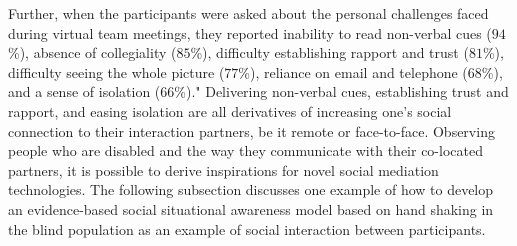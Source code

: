 \documentclass[oneside,11pt]{memoir}
\begin{document}
Further, when the participants were asked about the personal challenges faced during virtual team meetings, they reported inability to read non-verbal cues ($94$\%), absence of collegiality ($85$\%), difficulty establishing rapport and trust ($81$\%), difficulty seeing the whole picture ($77$\%), reliance on email and telephone ($68$\%), and a sense of isolation ($66$\%)." Delivering non-verbal cues, establishing trust and rapport, and easing isolation are all derivatives of increasing one's social connection to their interaction partners, be it remote or face-to-face. Observing people who are disabled and the way they communicate with their co-located partners, it is possible to derive inspirations for novel social mediation technologies. The following subsection discusses one example of how to develop an evidence-based social situational awareness model based on hand shaking in the blind population as an example of social interaction between participants.
\end{document}
